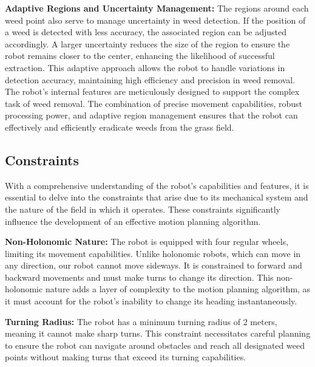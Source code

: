 \vspace*{6mm}

\textbf{Adaptive Regions and Uncertainty Management: }
The regions around each weed point also serve to manage uncertainty in weed detection. If the position of a weed is detected with less accuracy, the associated region can be adjusted accordingly. A larger uncertainty reduces the size of the region to ensure the robot remains closer to the center, enhancing the likelihood of successful extraction. This adaptive approach allows the robot to handle variations in detection accuracy, maintaining high efficiency and precision in weed removal. The robot's internal features are meticulously designed to support the complex task of weed removal. The combination of precise movement capabilities, robust processing power, and adaptive region management ensures that the robot can effectively and efficiently eradicate weeds from the grass field.

\subsection{Constraints}

With a comprehensive understanding of the robot's capabilities and features, it is essential to delve into the constraints that arise due to its mechanical system and the nature of the field in which it operates. These constraints significantly influence the development of an effective motion planning algorithm.

\vspace*{6mm}

\textbf{Non-Holonomic Nature:}
The robot is equipped with four regular wheels, limiting its movement capabilities. Unlike holonomic robots, which can move in any direction, our robot cannot move sideways. It is constrained to forward and backward movements and must make turns to change its direction. This non-holonomic nature adds a layer of complexity to the motion planning algorithm, as it must account for the robot's inability to change its heading instantaneously.

\vspace*{6mm}

\textbf{Turning Radius:} The robot has a minimum turning radius of 2 meters, meaning it cannot make sharp turns. This constraint necessitates careful planning to ensure the robot can navigate around obstacles and reach all designated weed points without making turns that exceed its turning capabilities.

